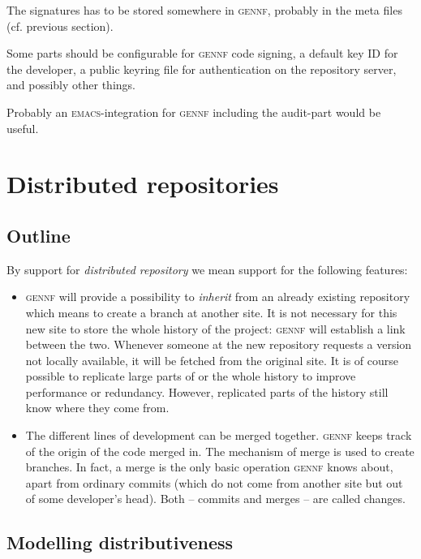 \documentclass[fleqn, 10pt, a4paper]{report} \usepackage{amssymb}
\begin{document}
The signatures has to be stored somewhere in \textsc{gennf},
probably in the meta files (cf. previous section).

Some parts should be configurable for \textsc{gennf} code signing, a
default key ID for the developer, a public keyring file for
authentication on the repository server, and possibly other things.

Probably an \textsc{emacs}-integration for \textsc{gennf} including
the audit-part would be useful.


\section{Distributed repositories \label{distrib}}

\subsection{Outline}

By support for \emph{distributed repository} we mean support for the
following features:

\begin{itemize}
\item \textsc{gennf} will provide a possibility to \emph{inherit} from
  an already existing repository which means to create a branch at
  another site. It is not necessary for this new site to store the
  whole history of the project: \textsc{gennf} will establish a link
  between the two.  Whenever someone at the new repository requests a
  version not locally available, it will be fetched from the original
  site. It is of course possible to replicate large parts of or the
  whole history to improve performance or redundancy. However,
  replicated parts of the history still know where they come from.

\item The different lines of development can be merged together.
  \textsc{gennf} keeps track of the origin of the code merged in. The
  mechanism of merge is used to create branches. In fact, a merge is
  the only basic operation \textsc{gennf} knows about, apart from
  ordinary commits (which do not come from another site but out of
  some developer's head).  Both -- commits and merges -- are called
  changes.
\end{itemize}

\subsection{Modelling distributiveness}
\end{document}
